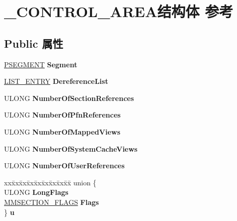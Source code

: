 \hypertarget{struct___c_o_n_t_r_o_l___a_r_e_a}{}\section{\+\_\+\+C\+O\+N\+T\+R\+O\+L\+\_\+\+A\+R\+E\+A结构体 参考}
\label{struct___c_o_n_t_r_o_l___a_r_e_a}
\subsection*{Public 属性}
\begin{DoxyCompactItemize}
\item 
\mbox{\label{struct___c_o_n_t_r_o_l___a_r_e_a_a017cb136a531df7bafe7528d09f7c394}} 
\hyperlink{struct___s_e_g_m_e_n_t}{P\+S\+E\+G\+M\+E\+NT} {\bfseries Segment}
\item 
\mbox{\label{struct___c_o_n_t_r_o_l___a_r_e_a_ae53dca819f94189be6ba3fb297a96d99}} 
\hyperlink{struct___l_i_s_t___e_n_t_r_y}{L\+I\+S\+T\+\_\+\+E\+N\+T\+RY} {\bfseries Dereference\+List}
\item 
\mbox{\label{struct___c_o_n_t_r_o_l___a_r_e_a_a122a594a65f81d3ff6c3bbd5376747da}} 
U\+L\+O\+NG {\bfseries Number\+Of\+Section\+References}
\item 
\mbox{\label{struct___c_o_n_t_r_o_l___a_r_e_a_adbff9c17f6201428d83236bf613b1856}} 
U\+L\+O\+NG {\bfseries Number\+Of\+Pfn\+References}
\item 
\mbox{\label{struct___c_o_n_t_r_o_l___a_r_e_a_a20224e72be95bdfa075ab82c915387e5}} 
U\+L\+O\+NG {\bfseries Number\+Of\+Mapped\+Views}
\item 
\mbox{\label{struct___c_o_n_t_r_o_l___a_r_e_a_af5adada5424faea4281cfba52821bdaa}} 
U\+L\+O\+NG {\bfseries Number\+Of\+System\+Cache\+Views}
\item 
\mbox{\label{struct___c_o_n_t_r_o_l___a_r_e_a_a4e3bf64993e043620abbd3406360022a}} 
U\+L\+O\+NG {\bfseries Number\+Of\+User\+References}
\item 
\mbox{\label{struct___c_o_n_t_r_o_l___a_r_e_a_ad6905abaed4b67d296dba7ede09ab4a1}} 
\begin{tabbing}
xx\=xx\=xx\=xx\=xx\=xx\=xx\=xx\=xx\=\kill
union \{\\
\>ULONG {\bfseries LongFlags}\\
\>\hyperlink{struct___m_m_s_e_c_t_i_o_n___f_l_a_g_s}{MMSECTION\_FLAGS} {\bfseries Flags}\\
\} {\bfseries u}\\


\end{tabbing}
\end{DoxyCompactItemize}
